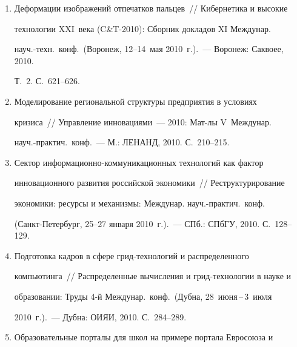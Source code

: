   \begin{enumerate}[1.]


\item {}


Деформации изображений отпечатков пальцев~/\!\!/  Кибернетика и высокие 


технологии XXI~века (C\&T-2010): Сборник докладов XI Междунар.\ 


науч.-техн.\ конф.\ (Воронеж, 12--14~мая 2010~г.).~--- Воронеж: Саквоее, 2010. 


Т.~2. С.~621--626.


\item {}


Моделирование региональной структуры предприятия в условиях 


кризиса~/\!\!/  Управление инновациями~--- 2010: Мат-лы V~Междунар.\


науч.-практич.\ конф.~--- М.: ЛЕНАНД, 2010. С.~210--215.


\item {}


Сектор ин\-фор\-ма\-ци\-он\-но-ком\-му\-ни\-ка\-ци\-он\-ных технологий как фактор 


инновационного развития российской экономики~/\!\!/  Реструктурирование 


экономики: ресурсы и механизмы: Междунар. науч.-практич.\ конф.\ 


(Санкт-Петербург, 25--27 января 2010~г.).~--- СПб.: СПбГУ, 2010. С.~128--129.





\item {}


Подготовка кадров в сфере грид-технологий и распределенного 


компьютинга~/\!\!/  Распределенные вычисления и грид-технологии в науке и 


образовании: Труды 4-й Междунар.\ конф.\ (Дубна, 28~июня\,--\,3~июля 


2010~г.).~--- Дубна: ОИЯИ, 2010. С.~284--289.


\item {}


Образовательные порталы для школ на примере портала Евросоюза и 



\end{enumerate}
